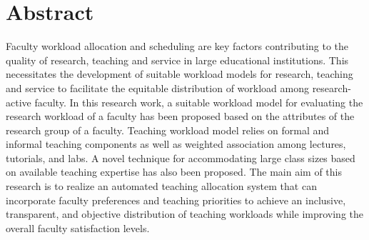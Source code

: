 
\chapter*{Abstract}

Faculty workload allocation and scheduling are key factors contributing to the quality of research, teaching and service in large educational institutions. This necessitates the development of suitable workload models for research, teaching and service to facilitate the equitable distribution of workload among research-active faculty. In this research work, a suitable workload model for evaluating the research workload of a faculty has been proposed based on the attributes of the research group of a faculty. Teaching workload model relies on formal and informal teaching components as well as weighted association among lectures, tutorials, and labs. A novel technique for accommodating large class sizes based on available teaching expertise has also been proposed. The main aim of this research is to realize an automated teaching allocation system that can incorporate faculty preferences and teaching priorities to achieve an inclusive, transparent, and objective distribution of teaching workloads while improving the overall faculty satisfaction levels.
